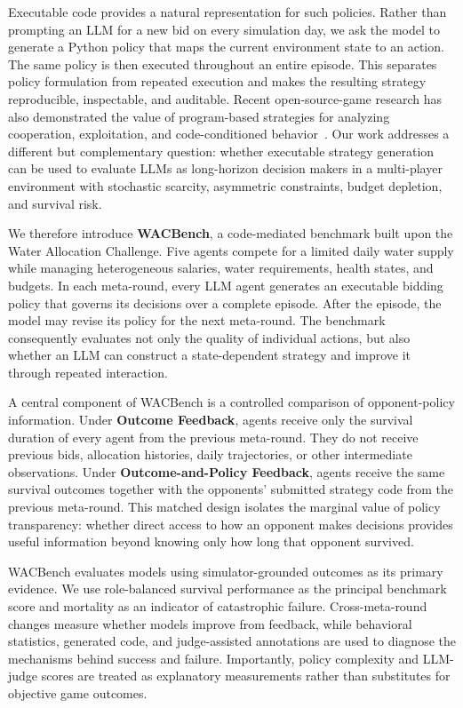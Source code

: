 \documentclass[letterpaper]{article} %
\begin{document}
Executable code provides a natural representation for such policies. Rather than prompting an LLM for a new bid on every simulation day, we ask the model to generate a Python policy that maps the current environment state to an action. The same policy is then executed throughout an entire episode. This separates policy formulation from repeated execution and makes the resulting strategy reproducible, inspectable, and auditable. Recent open-source-game research has also demonstrated the value of program-based strategies for analyzing cooperation, exploitation, and code-conditioned behavior~\cite{sistla2025opensourcegames}. Our work addresses a different but complementary question: whether executable strategy generation can be used to evaluate LLMs as long-horizon decision makers in a multi-player environment with stochastic scarcity, asymmetric constraints, budget depletion, and survival risk.

We therefore introduce \textbf{WACBench}, a code-mediated benchmark built upon the Water Allocation Challenge. Five agents compete for a limited daily water supply while managing heterogeneous salaries, water requirements, health states, and budgets. In each meta-round, every LLM agent generates an executable bidding policy that governs its decisions over a complete episode. After the episode, the model may revise its policy for the next meta-round. The benchmark consequently evaluates not only the quality of individual actions, but also whether an LLM can construct a state-dependent strategy and improve it through repeated interaction.

A central component of WACBench is a controlled comparison of opponent-policy information. Under \textbf{Outcome Feedback}, agents receive only the survival duration of every agent from the previous meta-round. They do not receive previous bids, allocation histories, daily trajectories, or other intermediate observations. Under \textbf{Outcome-and-Policy Feedback}, agents receive the same survival outcomes together with the opponents' submitted strategy code from the previous meta-round. This matched design isolates the marginal value of policy transparency: whether direct access to how an opponent makes decisions provides useful information beyond knowing only how long that opponent survived.

WACBench evaluates models using simulator-grounded outcomes as its primary evidence. We use role-balanced survival performance as the principal benchmark score and mortality as an indicator of catastrophic failure. Cross-meta-round changes measure whether models improve from feedback, while behavioral statistics, generated code, and judge-assisted annotations are used to diagnose the mechanisms behind success and failure. Importantly, policy complexity and LLM-judge scores are treated as explanatory measurements rather than substitutes for objective game outcomes.
\end{document}

